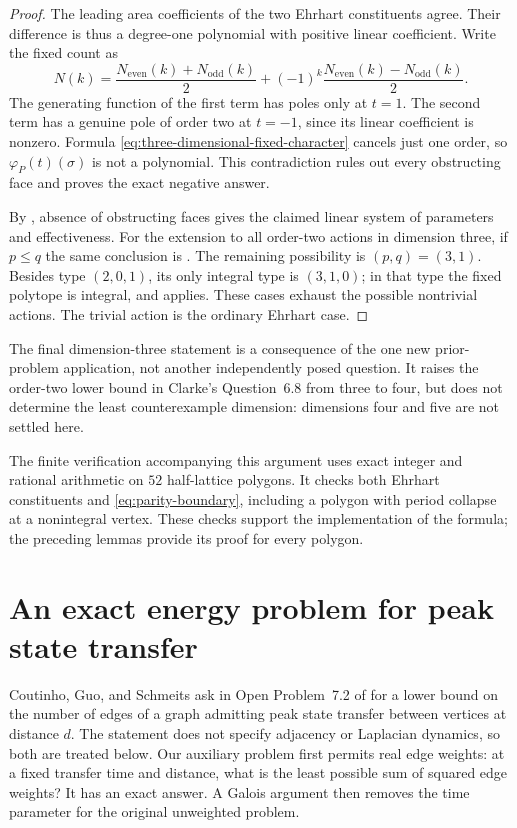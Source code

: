 \documentclass[11pt,a4paper]{article}
\theoremstyle{definition}\newtheorem{definition}[lemma]{Definition}
\theoremstyle{remark}\newtheorem{remark}[lemma]{Remark}
\begin{document}
\begin{proof}
The leading area coefficients of the two Ehrhart constituents agree.
Their difference is thus a degree-one polynomial with positive linear
coefficient. Write the fixed count as
\[
 N(k)=\frac{N_{\mathrm{even}}(k)+N_{\mathrm{odd}}(k)}2
       +(-1)^k\frac{N_{\mathrm{even}}(k)-N_{\mathrm{odd}}(k)}2.
\]
The generating function of the first term has poles only at $t=1$.
The second term has a genuine pole of order two at $t=-1$, since its
linear coefficient is nonzero. Formula
\eqref{eq:three-dimensional-fixed-character} cancels just one order, so
$\varphi_P(t)(\sigma)$ is not a polynomial. This contradiction rules out
every obstructing face and proves the exact negative answer.

By \cite[Theorem~4.2]{Clarke26}, absence of obstructing faces gives the
claimed linear system of parameters and effectiveness. For the extension
to all order-two actions in dimension three, if $p\leq q$ the same
conclusion is \cite[Corollary~4.4]{Clarke26}. The remaining possibility is
$(p,q)=(3,1)$. Besides type $(2,0,1)$, its only integral type is $(3,1,0)$;
in that type the fixed polytope is integral, and
\cite[Corollary~4.5]{Clarke26} applies. These cases exhaust the possible
nontrivial actions. The trivial action is the ordinary Ehrhart case.
\end{proof}

The final dimension-three statement is a consequence of the one new
prior-problem application, not another independently posed question.
It raises the order-two lower bound in Clarke's Question~6.8 from three
to four, but does not determine the least counterexample dimension:
dimensions four and five are not settled here.

The finite verification accompanying this argument uses exact integer and
rational arithmetic on $52$ half-lattice polygons. It checks both Ehrhart
constituents and \eqref{eq:parity-boundary}, including a polygon with period
collapse at a nonintegral vertex. These checks support the implementation
of the formula; the preceding lemmas provide its proof for every polygon.

\section{An exact energy problem for peak state transfer}
\label{sec:peak-energy}

Coutinho, Guo, and Schmeits ask in Open Problem~7.2 of
\cite{CGS25} for a lower bound on the number of edges of a graph admitting
peak state transfer between vertices at distance $d$. The statement does
not specify adjacency or Laplacian dynamics, so both are treated below.
Our auxiliary problem first permits real edge weights: at a fixed transfer
time and distance, what is the least possible sum of squared edge weights?
It has an exact answer. A Galois argument then removes the time parameter
for the original unweighted problem.
\end{document}

